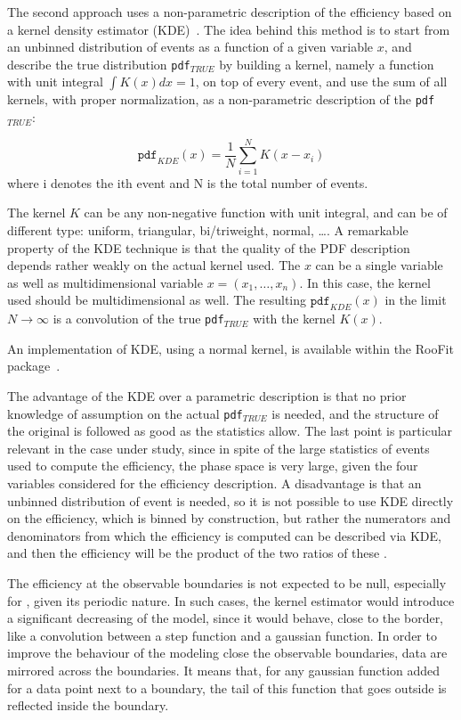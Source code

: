 The second approach uses a non-parametric description of the
efficiency based on a kernel density estimator
(KDE)~\cite{opac-b1089297,Cranmer:2000du}.  The idea behind this
method is to start from an unbinned distribution of events as a
function of a given variable $x$, and describe the true distribution
\texttt{pdf}$_{TRUE}$ by building a kernel, namely a function with
unit integral $\int{K(x)dx}=1$, on top of every event, and use the sum
of all kernels, with proper normalization, as a non-parametric
description of the \texttt{pdf}$_{TRUE}$:

\begin{equation}\label{eq:KDE}
    \mathtt{pdf}_{KDE}(x)=\frac{1}{N}\sum_{i=1}^{N} K(x-x_i)
\end{equation}
where i denotes the ith event and N is the total number of events.

The kernel $K$ can be any non-negative function with unit integral, and can be
of different type: uniform, triangular, bi/triweight, normal, \ldots. A
remarkable property of the KDE technique is that the quality of the PDF
description depends rather weakly on the actual kernel used.
The $x$ can be a single variable as well as multidimensional variable
$x=(x_1,\ldots,x_n)$. In this case, the kernel used should be multidimensional
as well. The resulting $\mathtt{pdf}_{KDE}(x)$ in the limit $N\to\infty$ 
is a convolution of the true \texttt{pdf}$_{TRUE}$ with the kernel $K(x)$.

An implementation of KDE, using a normal kernel, is available within the
{\sc RooFit} package~\cite{RooFit}. 

The advantage of the KDE over a parametric description is that no prior
knowledge of assumption on the actual \texttt{pdf}$_{TRUE}$ is needed, and the
structure of the original \pdf is followed as good as the statistics allow.
The last point is particular relevant in the case under study, since in spite
of the large statistics of events used to compute the efficiency, the phase
space is very large, given the four variables considered for the efficiency
description.
A disadvantage is that an unbinned distribution of event is needed, so it is
not possible to use KDE directly on the efficiency, which is binned by
construction, but rather the numerators and denominators from which the
efficiency is computed can be described via KDE, and then the efficiency will
be the product of the two ratios of these \pdf.

The efficiency at the observable boundaries is not expected to be null,
especially for \PHI, given its periodic nature. 
In such cases, the kernel estimator would introduce a significant decreasing of the model, since it would behave, close to the border, like a convolution between a step function and a gaussian function.
In order to improve the behaviour of the modeling close the observable
boundaries, data are mirrored across the boundaries. It means that, for any gaussian function added for a data point next to a boundary, the tail of this function that goes outside is reflected inside the boundary.


